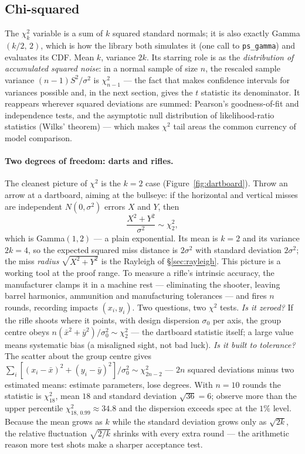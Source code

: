 \documentclass[11pt]{article}
\numberwithin{equation}{section}
\newcommand{\srcref}[1]{%
  \par\smallskip\noindent{\small\sffamily\color{inkS}\raggedright
  $\hookrightarrow$ implemented in \texttt{#1}\par}\smallskip}
\begin{document}
\srcref{src/dist.c: ps\_beta(), ps\_beta\_cdf()}

\subsection{Chi-squared}\label{sec:chisq}

The $\chi^2_k$ variable is a sum of $k$ squared standard normals; it is
also exactly Gamma$(k/2,\,2)$, which is how the library both simulates it
(one call to \texttt{ps\_gamma}) and evaluates its CDF.  Mean $k$,
variance $2k$.  Its starring role is as the \emph{distribution of
accumulated squared noise}: in a normal sample of size $n$, the rescaled
sample variance $(n-1)S^2/\sigma^2$ is $\chi^2_{n-1}$ --- the fact that
makes confidence intervals for variances possible and, in the next
section, gives the $t$ statistic its denominator.  It reappears wherever
squared deviations are summed: Pearson's goodness-of-fit and
independence tests, and the asymptotic null distribution of
likelihood-ratio statistics (Wilks' theorem) --- which makes $\chi^2$
tail areas the common currency of model comparison.

\paragraph{Two degrees of freedom: darts and rifles.}
The cleanest picture of $\chi^2$ is the $k=2$ case
(Figure~\ref{fig:dartboard}).  Throw an arrow at a dartboard, aiming at
the bullseye: if the horizontal and vertical misses
are independent $N(0,\sigma^2)$ errors $X$ and $Y$, then
\[
\frac{X^2+Y^2}{\sigma^2}\sim\chi^2_2 ,
\]
which is Gamma$(1,2)$ --- a plain exponential.  Its mean is $k=2$ and
its variance $2k=4$, so the expected squared miss distance is
$2\sigma^2$ with standard deviation $2\sigma^2$; the miss \emph{radius}
$\sqrt{X^2+Y^2}$ is the Rayleigh of \S\ref{sec:rayleigh}.  This picture
is a working tool at the proof range.  To measure a rifle's intrinsic
accuracy, the manufacturer clamps it in a machine rest --- eliminating
the shooter, leaving barrel harmonics, ammunition and manufacturing
tolerances --- and fires $n$ rounds, recording impacts $(x_i,y_i)$.
Two questions, two $\chi^2$ tests.  \emph{Is it zeroed?}  If the rifle
shoots where it points, with design dispersion $\sigma_0$ per axis, the
group centre obeys $n(\bar x^2+\bar y^2)/\sigma_0^2\sim\chi^2_2$ ---
the dartboard statistic itself; a large value means systematic bias (a
misaligned sight, not bad luck).  \emph{Is it built to tolerance?}  The
scatter about the group centre gives
$\sum_i[(x_i-\bar x)^2+(y_i-\bar y)^2]/\sigma_0^2\sim\chi^2_{2n-2}$ ---
$2n$ squared deviations minus two estimated means: estimate parameters,
lose degrees.  With $n=10$ rounds the statistic is $\chi^2_{18}$, mean
$18$ and standard deviation $\sqrt{36}=6$; observe more than the upper
percentile $\chi^2_{18,\,0.99}\approx 34.8$ and the dispersion exceeds
spec at the $1\%$ level.  Because the mean grows as $k$ while the
standard deviation grows only as $\sqrt{2k}$, the relative fluctuation
$\sqrt{2/k}$ shrinks with every extra round --- the arithmetic reason
more test shots make a sharper acceptance test.
\end{document}
